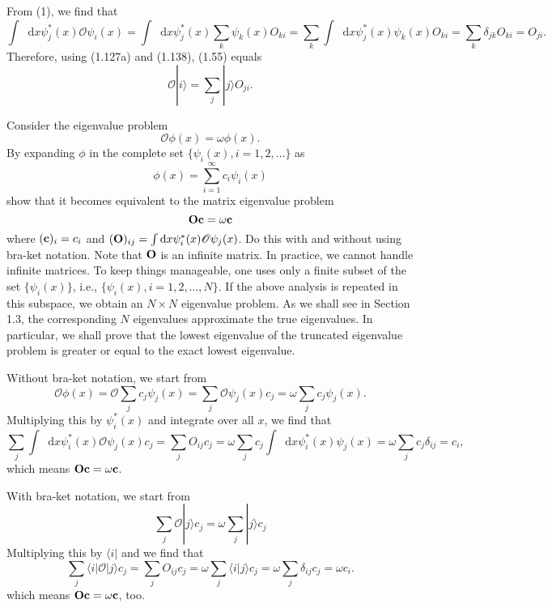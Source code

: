 \documentclass[a4paper]{book}
\newcounter{exercise}[chapter]
\newcounter{solution}[chapter]
\newcommand*{\dif}{\mathop{}\!\mathrm{d}}
\newcommand{\Op}{{\bf O}}
\begin{document}
	\begin{solution}
	
	From (1), we find that
	\[
		\int \dif x \psi^*_j(x) \mathscr{O} \psi_i(x) = \int \dif x \psi^*_j(x) \sum_{k} \psi_k(x) O_{ki} = \sum_{k} \int \dif x \psi^*_j(x) \psi_k(x) O_{ki} = \sum_{k} \delta_{jk} O_{ki} = O_{ji} .
	\]
	Therefore, using (1.127a) and (1.138), (1.55) equals
	\[
		\mathscr{O} | i \rangle = \sum_j | j \rangle O_{ji} .
	\]
	
	\end{solution}	
	
	\begin{exercise}
	Consider the eigenvalue problem
	\begin{equation}
		\mathscr{O} \phi(x) = \omega \phi(x).
	\end{equation}
	By expanding $\phi$ in the complete set $\{\psi_i(x),i=1,2,\ldots\}$ as
	\begin{equation*}
		\phi(x) = \sum_{i=1}^\infty c_i \psi_i(x)
	\end{equation*}
	show that it becomes equivalent to the matrix eigenvalue problem
	\begin{equation*}
		\Op {\bf c} = \omega {\bf c}
	\end{equation*}
	where $({\bf c})_i=c_i$ and $({\bf O})_{ij} = \int \dif x \psi^*_i(x)\mathscr{O}\psi_j(x)$. Do this with and without using bra-ket notation. Note that $\Op$ is an infinite matrix. In practice, we cannot handle infinite matrices. To keep things manageable, one uses only a finite subset of the set $\{\psi_i(x)\}$, i.e., $\{\psi_i(x),i=1,2,\ldots, N\}$. If the above analysis is repeated in this subspace, we obtain an $N \times N$ eigenvalue problem. As we shall see in Section 1.3, the corresponding $N$ eigenvalues approximate the true eigenvalues. In particular, we shall prove that the lowest eigenvalue of the truncated eigenvalue problem is greater or equal to the exact lowest eigenvalue.
	\end{exercise}
	
	\begin{solution}
	
	Without bra-ket notation, we start from
	\[
		\mathscr{O} \phi(x) = \mathscr{O} \sum_j c_j \psi_j(x) = \sum_j \mathscr{O} \psi_j(x) c_j = \omega \sum_j c_j \psi_j(x) .
	\]
	Multiplying this by $\psi^*_i(x)$ and integrate over all $x$, we find that
	\[
		\sum_j \int \dif x \psi^*_i(x) \mathscr{O} \psi_j(x) c_j = \sum_j O_{ij} c_j = \omega \sum_j c_j \int \dif x \psi^*_i(x) \psi_j(x) = \omega \sum_j c_j \delta_{ij} = c_i ,
	\]
	which means $\Op {\bf c} = \omega {\bf c}$.
	
	With bra-ket notation, we start from
	\[
		\sum_j \mathscr{O} | j \rangle c_j = \omega \sum_j | j \rangle c_j
	\]
	Multiplying this by $\langle i |$ and we find that
	\[
		\sum_j \langle i | \mathscr{O} | j \rangle c_j = \sum_j O_{ij} c_j = \omega \sum_j \langle i | j \rangle c_j = \omega \sum_j \delta_{ij} c_j = \omega c_i .
	\]
	which means $\Op {\bf c} = \omega {\bf c}$, too.
	\end{solution}
	
\end{document}
